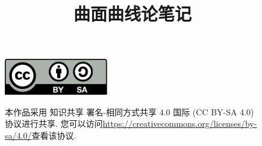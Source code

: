 \documentclass[11pt,
    lang=cn,
    cnfontset=founder,
    enfontset=gnu,
    mathfontset=newtx,
    print=true]{aklbook}
\title{曲面曲线论笔记}
\affil{北京师范大学数学科学学院}
\numberwithin{equation}{section}
\begin{document}
    \maketitle
    \vspace*{15cm}
    \thispagestyle{empty}
    \begin{figure}[ht]
        \includegraphics[width=0.4\textwidth]{by-sa.pdf}\hspace{0.05\textwidth}\begin{minipage}[b]{0.55\textwidth}
        本作品采用 知识共享 署名-相同方式共享 4.0 国际 (CC BY-SA 4.0) 协议进行共享. 您可以访问\url{https://creativecommons.org/licenses/by-sa/4.0/}查看该协议.
        \end{minipage}
    \end{figure}

    \frontmatter
    

    \tableofcontents

    \mainmatter
    

    \appendix
    \printbibliography[title={参考文献},heading=bibintoc]
\end{document}
